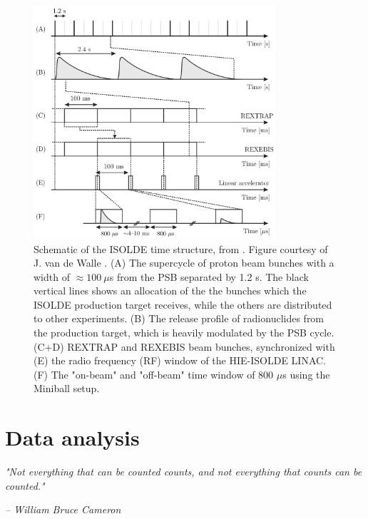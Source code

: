 \documentclass[twoside,english]{uiofysmaster/uiofysmaster}
\begin{document}
\begin{figure}[ht]
	\centering
	\includegraphics[width=0.8\textwidth]{Images/Time-structure.png}
	\caption{Schematic of the ISOLDE time structure, from \cite{Gaffney}. Figure courtesy of J. van de Walle \cite{HI-TDR}. (A) The supercycle of proton beam bunches with a width of $\approx 100 ~\mu$s from the PSB separated by 1.2 s. The black vertical lines shows an allocation of the the bunches which the ISOLDE production target receives, while the others are distributed to other experiments. (B) The release profile of radionuclides from the production target, which is heavily modulated by the PSB cycle. (C+D) REXTRAP and REXEBIS beam bunches, synchronized with (E) the radio frequency (RF) window of the HIE-ISOLDE LINAC. (F) The "on-beam" and "off-beam" time window of 800 $\mu$s using the Miniball setup.}
	\label{fig:ITS}
\end{figure}




\chapter{Data analysis}\label{ch:DA}
\epigraph{\textit{"Not everything that can be counted counts, and not everything that counts can be counted."}}{\textit{– William Bruce Cameron}}
\end{document}

